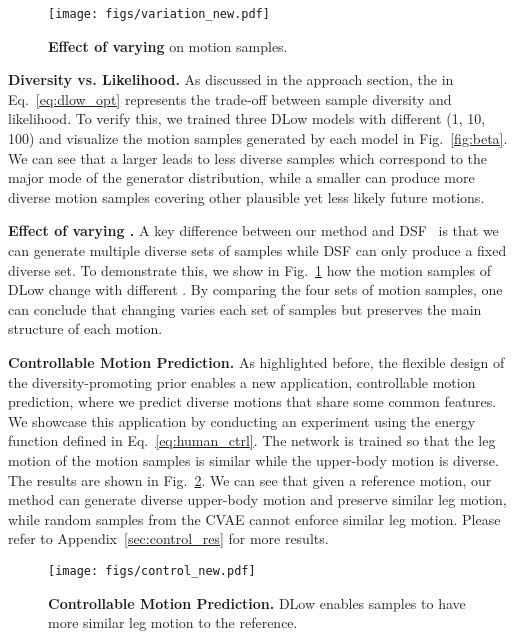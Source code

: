 \documentclass[runningheads]{llncs}
\begin{document}
	\begin{figure}[t]
		\centering
		\texttt{[image: figs/variation\_new.pdf]}
		\vspace{-5mm}
		\caption{\textbf{Effect of varying } on motion samples. }
		\label{fig:var}
		\vspace{-3mm}
	\end{figure}
	
	\vspace{1mm}
	\noindent\textbf{Diversity vs. Likelihood.} As discussed in the approach section, the  in Eq.~\eqref{eq:dlow_opt} represents the trade-off between sample diversity and likelihood. To verify this, we trained three DLow models with different  (1, 10, 100) and visualize the motion samples generated by each model in Fig.~\ref{fig:beta}. We can see that a larger  leads to less diverse samples which correspond to the major mode of the generator distribution, while a smaller  can produce more diverse motion samples covering other plausible yet less likely future motions.
	
	\vspace{1mm}
	\noindent\textbf{Effect of varying .} A key difference between our method and DSF~\cite{yuan2019diverse} is that we can generate multiple diverse sets of samples while DSF can only produce a fixed diverse set. To demonstrate this, we show in Fig.~\ref{fig:var} how the motion samples of DLow change with different . By comparing the four sets of motion samples, one can conclude that changing  varies each set of samples but preserves the main structure of each motion.
	
	\vspace{1mm}
	\noindent\textbf{Controllable Motion Prediction.}
	As highlighted before, the flexible design of the diversity-promoting prior enables a new application, controllable motion prediction, where we predict diverse motions that share some common features. We showcase this application by conducting an experiment using the energy function defined in Eq.~\eqref{eq:human_ctrl}. 
	The network is trained so that the leg motion of the motion samples is similar while the upper-body motion is diverse.
	The results are shown in Fig.~\ref{fig:control}. We can see that given a reference motion, our method can generate diverse upper-body motion and preserve similar leg motion, while random samples from the CVAE cannot enforce similar leg motion. Please refer to Appendix~\ref{sec:control_res} for more results.
	
	
	\begin{figure}[t]
		\centering
		\texttt{[image: figs/control\_new.pdf]}
		\vspace{-7mm}
		\caption{\textbf{Controllable Motion Prediction.} DLow enables samples to have more similar leg motion to the reference.}
		\label{fig:control}
		\vspace{-6mm}
	\end{figure}
	
\end{document}
